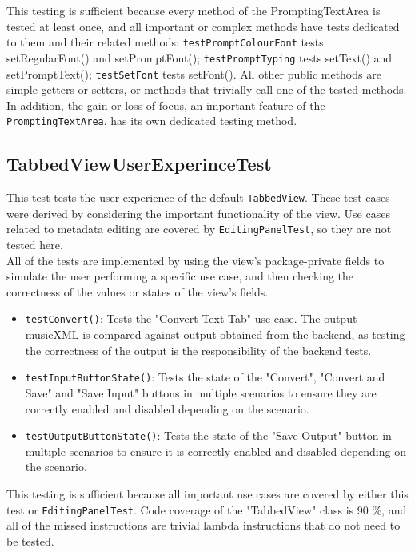 \documentclass[11pt]{article}
\begin{document}
This testing is sufficient because every method of the PromptingTextArea is tested at least once, and all important or complex methods have tests dedicated to them and their related methods: \texttt{testPromptColourFont} tests setRegularFont() and setPromptFont(); \texttt{testPromptTyping} tests setText() and setPromptText(); \texttt{testSetFont} tests setFont().  All other public methods are simple getters or setters, or methods that trivially call one of the tested methods.  In addition, the gain or loss of focus, an important feature of the \texttt{PromptingTextArea}, has its own dedicated testing method.\\
\subsection{TabbedViewUserExperinceTest}
\label{sec:org089f375}
This test tests the user experience of the default \texttt{TabbedView}.  These test cases were derived by considering the important functionality of the view.  Use cases related to metadata editing are covered by \texttt{EditingPanelTest}, so they are not tested here.\\
All of the tests are implemented by using the view's package-private fields to simulate the user performing a specific use case, and then checking the correctness of the values or states of the view's fields.\\
\begin{itemize}
\item \texttt{testConvert()}: Tests the "Convert Text Tab" use case.  The output musicXML is compared against output obtained from the backend, as testing the correctness of the output is the responsibility of the backend tests.\\
\item \texttt{testInputButtonState()}: Tests the state of the "Convert", "Convert and Save" and "Save Input" buttons in multiple scenarios to ensure they are correctly enabled and disabled depending on the scenario.\\
\item \texttt{testOutputButtonState()}: Tests the state of the "Save Output" button in multiple scenarios to ensure it is correctly enabled and disabled depending on the scenario.\\
\end{itemize}

This testing is sufficient because all important use cases are covered by either this test or \texttt{EditingPanelTest}.  Code coverage of the "TabbedView" class is 90 \%, and all of the missed instructions are trivial lambda instructions that do not need to be tested.\\
\end{document}
